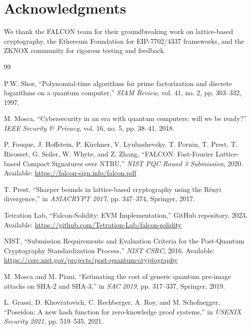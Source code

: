 \section*{Acknowledgments}


We thank the FALCON team for their groundbreaking work on lattice-based cryptography, the Ethereum Foundation for EIP-7702/4337 frameworks, and the ZKNOX community for rigorous testing and feedback.


\begin{thebibliography}{99}

P.W. Shor,
``Polynomial-time algorithms for prime factorization and discrete logarithms on a quantum computer,''
\textit{SIAM Review}, vol. 41, no. 2, pp. 303--332, 1997.

M. Mosca,
``Cybersecurity in an era with quantum computers: will we be ready?''
\textit{IEEE Security \& Privacy}, vol. 16, no. 5, pp. 38--41, 2018.

P. Fouque, J. Hoffstein, P. Kirchner, V. Lyubashevsky, T. Pornin, T. Prest, T. Ricosset, G. Seiler, W. Whyte, and Z. Zhang,
``FALCON: Fast-Fourier Lattice-based Compact Signatures over NTRU,''
\textit{NIST PQC Round 3 Submission}, 2020.
Available: \url{https://falcon-sign.info/falcon.pdf}

T. Prest,
``Sharper bounds in lattice-based cryptography using the R\'enyi divergence,''
in \textit{ASIACRYPT 2017}, pp. 347--374, Springer, 2017.

Tetration Lab,
``Falcon-Solidity: EVM Implementation,''
GitHub repository, 2023.
Available: \url{https://github.com/Tetration-Lab/falcon-solidity}

NIST,
``Submission Requirements and Evaluation Criteria for the Post-Quantum Cryptography Standardization Process,''
\textit{NIST CSRC}, 2016.
Available: \url{https://csrc.nist.gov/projects/post-quantum-cryptography}

M. Mosca and M. Piani,
``Estimating the cost of generic quantum pre-image attacks on SHA-2 and SHA-3,''
in \textit{SAC 2019}, pp. 317--337, Springer, 2019.

L. Grassi, D. Khovratovich, C. Rechberger, A. Roy, and M. Schofnegger,
``Poseidon: A new hash function for zero-knowledge proof systems,''
in \textit{USENIX Security 2021}, pp. 519--535, 2021.


\end{thebibliography}
